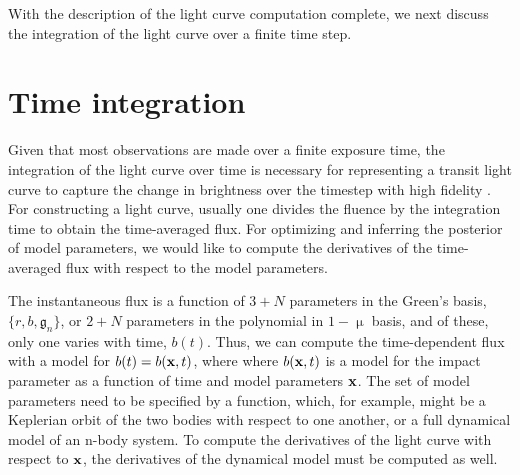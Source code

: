 \documentclass[modern]{aastex61}
\begin{document}
%
%

With the description of the light curve computation complete, we next discuss
the integration of the light curve over a finite time step.



\section{Time integration} \label{sec:time}

Given that most observations are made over a finite exposure time,
the integration of the light curve over time is necessary for representing
a transit light curve to capture the change in brightness over the timestep
with high fidelity \citep{Kipping2010}.  For constructing
a light curve, usually one divides the fluence by the integration time
to obtain the time-averaged flux.  For optimizing and inferring the 
posterior of model parameters, we would like to compute the derivatives
of the time-averaged flux with respect to the model parameters.

The instantaneous flux is a function of $3+N$ parameters in the Green's basis, 
$\{r,b,\mathfrak{g}_n\}$, or $2+N$ parameters in the polynomial in $1-\upmu$ basis, and of
these, only one varies with time, $b(t)$.  Thus, we can compute the 
time-dependent flux with a model for $b(t)=b({\mathbf{x}},t)$, where
where $b({\mathbf{x}},t)$ is a model for the impact parameter as a function of time
and model parameters ${\mathbf{x}}$.  The set of model parameters need to be specified
by a function, which, for example, might be a Keplerian orbit of the two bodies
with respect to one another, or a full dynamical model of an n-body system.
To compute the derivatives of the light curve with respect to ${\mathbf{x}}$, the
derivatives of the dynamical model must be computed as well.
\end{document}
